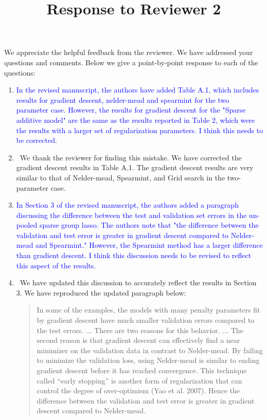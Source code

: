 \documentclass[]{article}
\title{Response to Reviewer 2}
\newcommand{\point}[1]{\item \textcolor{blue}{#1}}
\newcommand{\reply}{\item[]\ }
\begin{document}
	\maketitle
		
	We appreciate the helpful feedback from the reviewer. We have addressed your questions and comments. Below we give a point-by-point response to each of the questions:
		
	\begin{enumerate}
		\point{In the revised manuscript, the authors have added Table A.1, which includes results for gradient descent, nelder-mead and spearmint for the two parameter case.  However, the results for gradient descent for the "Sparse additive model" are the same as the results reported in Table 2, which were the results with a larger set of regularization parameters.  I think this needs to be corrected.}
		
		\reply We thank the reviewer for finding this mistake. We have corrected the gradient descent results in Table A.1. The gradient descent results are very similar to that of Nelder-mead, Spearmint, and Grid search in the two-parameter case.
		
		\point{In Section 3 of the revised manuscript, the authors added a paragraph discussing the difference between the test and validation set errors in the un-pooled sparse group lasso.  The authors note that "the difference between the validation and test error is greater in gradient descent compared to Nelder-mead and Spearmint."  However, the Spearmint method has a larger difference than gradient descent.  I think this discussion needs to be revised to reflect this aspect of the results.}
		
		\reply We have updated this discussion to accurately reflect the results in Section 3. We have reproduced the updated paragraph below:
		
		\begin{quote}
			In some of the examples, the models with many penalty parameters fit by gradient descent have much smaller validation errors compared to the test errors. ... There are two reasons for this behavior. ... The second reason is that gradient descent can effectively find a near minimizer on the validation data in contrast to Nelder-mead. By failing to minimize the validation loss, using Nelder-mead is similar to ending gradient descent before it has reached convergence. This technique called ``early stopping'' is another form of regularization that can control the degree of over-optimism (Yao et al. 2007). Hence the difference between the validation and test error is greater in gradient descent compared to Nelder-mead.
				

\end{quote}
\end{enumerate}
\end{document}
